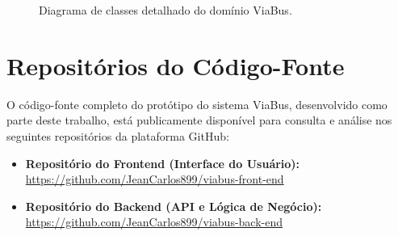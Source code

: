 \begin{apendicesenv}
\begin{figure}[H]
    \caption{Diagrama de classes detalhado do domínio ViaBus.}
    \label{fig:uml-dominio}
  \end{figure}

  \chapter{Repositórios do Código-Fonte}
  \label{apendice:repositorios}

  O código-fonte completo do protótipo do sistema ViaBus, desenvolvido como parte deste trabalho, está publicamente disponível para consulta e análise nos seguintes repositórios da plataforma GitHub:

  \vspace{1cm}

  \begin{itemize}
    \item \textbf{Repositório do Frontend (Interface do Usuário):} \\
          \url{https://github.com/JeanCarlos899/viabus-front-end}

    \item \textbf{Repositório do Backend (API e Lógica de Negócio):} \\
          \url{https://github.com/JeanCarlos899/viabus-back-end}
  \end{itemize}
\end{apendicesenv}